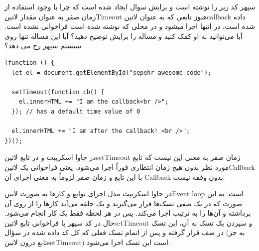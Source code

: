 
سپهر کد زیر را نوشته است و برایش سوال ایجاد شده است که چرا با وجود استفاده از زمان صفر به عنوان مقدار ‌لاتین{Timeout}
هنوز تابعی که به عنوان ‌لاتین{callback} داده شده است، در انتها اجرا میشود و در محلی که نوشته شده است فراخوانی نشده است. آیا می‌توانید به او کمک کنید و مساله را برایش توضیح دهید؟
آیا این مساله تنها روی سیستم سپهر رخ می دهد؟

\begin{latin}
\begin{verbatim}
(function () {
  let el = document.getElementById("sepehr-awesome-code");

  setTimeout(function cb() {
    el.innerHTML += "I am the callback<br />";
  }); // has a default time value of 0

  el.innerHTML += "I am after the callback! <br />";
})();
\end{verbatim}
\end{latin}


\begin{answer}

در جاوا اسکریپت و در تابع ‌لاتین{setTimeout} زمان صفر به معنی این نیست که تابع مورد نظر بدون هیچ زمان انتظاری فوراً اجرا می‌شود.
یعنی فراخوانی یک ‌لاتین{Callback} با این تابع و زمان صفر لزوماً به معنی اجرای آن Callback بدون وقفه نیست.

در جاوا اسکریپت مدل اجرای توابع و کارها به صورت ‌لاتین{Event loop} است. به این صورت که در یک صفی تسک‌ها قرار می‌گیرند و یک حلقه می‌آید کارها را از روی آن برداشته و آن‌ها را به ترتیب اجرا می‌کند.
پس در هر لحظه فقط یک کار انجام می‌شود.
حال در کد سپهر با فراخوانی تابع ‌لاتین{setTimeout} و سپردن یک تسک به آن، این تسک در صف قرار گرفته و پس از اتمام تسک فعلی که کل کد داده شده در سؤال (به جز تابع درون ‌لاتین{setTimeout}) است این تسک اجرا می‌شود.

\end{answer}
